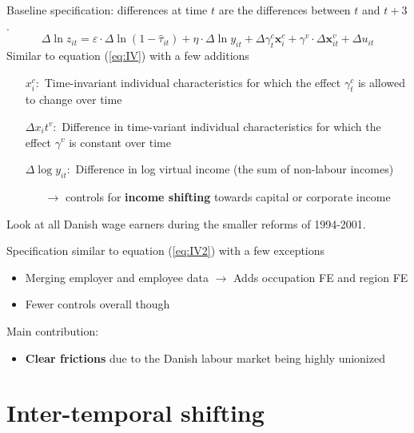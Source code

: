 \documentclass[8pt]{beamer}
\begin{document}
\begin{frame}{\citet{kleven2014estimating}}
Baseline specification: differences at time $t$ are the differences between $t$ and $t+3$.
  \begin{equation}
    \Delta\ln z_{it} = \varepsilon\cdot\Delta\ln(1-\hat{\tau}_{it}) + \eta\cdot\Delta\ln y_{it} + \Delta\gamma_t^c \bm{x}_i^c + \gamma^v\cdot\Delta\bm{x}_{it}^v + \Delta u_{it}
    \label{eq:IV2}
  \end{equation}
  Similar to equation (\ref{eq:IV}) \citep{gruber2002elasticity} with a few additions
  \begin{itemize}
    \item[$x_i^c:$] Time-invariant individual characteristics for which the effect $\gamma_t^c$ is allowed to change over time
    \item[$\Delta x_it^v:$] Difference in time-variant individual characteristics for which the effect $\gamma^v$ is constant over time
    \item[$\Delta \log y_{it}:$] Difference in log virtual income (the sum of non-labour incomes)
    \begin{itemize}
      \item[$\rightarrow$] controls for \textbf{income shifting} towards capital or corporate income
    \end{itemize}
  \end{itemize}
\end{frame}


\begin{frame}{\citet{chetty2011adjustment}}
  Look at all Danish wage earners during the smaller reforms of 1994-2001.

  Specification similar to equation (\ref{eq:IV2}) \citep{kleven2014estimating} with a few exceptions
  \begin{itemize}
    \item Merging employer and employee data $\rightarrow$ Adds occupation FE and region FE
    \item Fewer controls overall though
  \end{itemize}
  Main contribution:
  \begin{itemize}
    \item \textbf{Clear frictions} due to the Danish labour market being highly unionized
  \end{itemize}
\end{frame}


\section{Inter-temporal shifting}
\end{document}
